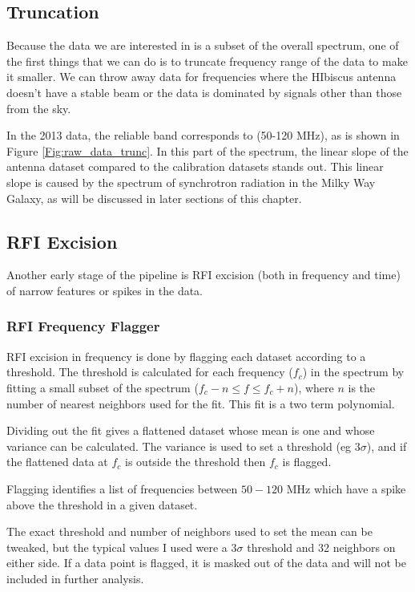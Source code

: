 \subsection{Truncation}

Because the data we are interested in is a subset of the overall spectrum, one of the first things that we can do is to truncate frequency range of the data to make it smaller. We can throw away data for frequencies where the HIbiscus antenna doesn't have a stable beam or the data is dominated by signals other than those from the sky. 

In the 2013 data, the reliable band corresponds to (50-120 MHz), as is shown in Figure \ref{Fig:raw_data_trunc}. In this part of the spectrum, the linear slope of the antenna dataset compared to the calibration datasets stands out. This linear slope is caused by the spectrum of synchrotron radiation in the Milky Way Galaxy, as will be discussed in later sections of this chapter. 

\subsection{RFI Excision}

Another early stage of the pipeline is RFI excision (both in frequency and time) of narrow features or spikes in the data. 

\subsubsection{RFI Frequency Flagger}

RFI excision in frequency is done by flagging each dataset according to a threshold. The threshold is calculated for each frequency ($f_c$) in the spectrum by fitting a small subset of the spectrum ($f_c-n \leq f \leq f_c + n$), where $n$ is the number of nearest neighbors used for the fit. This fit is a two term polynomial. 

Dividing out the fit gives a flattened dataset whose mean is one and whose variance can be calculated. The variance is used to set a threshold (eg $3 \sigma$), and if the flattened data at $f_c$ is outside the threshold then $f_c$ is flagged. 

Flagging identifies a list of frequencies between $50-120$ MHz which have a spike above the threshold in a given dataset. 

The exact threshold and number of neighbors used to set the mean can be tweaked, but the typical values I used were a 3$\sigma$ threshold and 32 neighbors on either side. If a data point is flagged, it is masked out of the data and will not be included in further analysis.  


